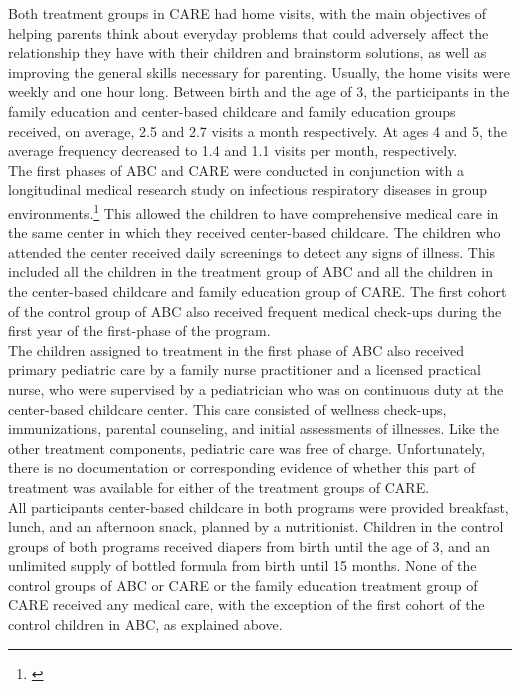 \noindent Both treatment groups in CARE had home visits, with the main objectives of helping parents think about everyday problems that could adversely affect the relationship they have with their children and brainstorm solutions, as well as improving the general skills necessary for parenting. Usually, the home visits were weekly and one hour long. Between birth and the age of 3, the participants in the family education and center-based childcare and family education groups received, on average, 2.5 and 2.7  visits a month respectively. At ages 4 and 5, the average frequency decreased to 1.4 and 1.1 visits per month, respectively.\\ 

\noindent The first phases of ABC and CARE were conducted in conjunction with a longitudinal medical research study on infectious respiratory diseases in group environments.\footnote{\citet{Henderson-et-al_1982_NEJoM}} This allowed the children to have comprehensive medical care in the same center in which they received center-based childcare. The children who attended the center received daily screenings to detect any signs of illness. This included all the children in the treatment group of ABC and all the children in the center-based childcare and family education group of CARE. The first cohort of the control group of ABC also received frequent medical check-ups during the first year of the first-phase of the program.\\

\noindent The children assigned to treatment in the first phase of ABC also received primary pediatric care by a family nurse practitioner and a licensed practical nurse, who were supervised by a pediatrician who was on continuous duty at the center-based childcare center. This care consisted of wellness check-ups, immunizations, parental counseling, and initial assessments of illnesses. Like the other treatment components, pediatric care was free of charge. Unfortunately, there is no documentation or corresponding evidence of whether this part of treatment was available for either of the treatment groups of CARE.\\

\noindent All participants center-based childcare in both programs were provided breakfast, lunch, and an afternoon snack, planned by a nutritionist. Children in the control groups of both programs received diapers from birth until the age of 3, and an unlimited supply of bottled formula from birth until 15 months. None of the control groups of  ABC or CARE or the family education treatment group of CARE received any medical care, with the exception of the first cohort of the control children in ABC, as explained above. 


